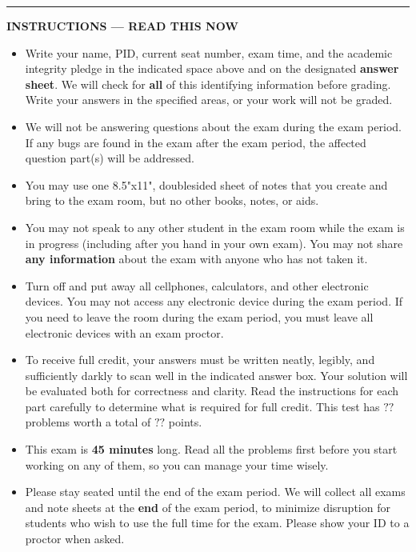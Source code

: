 \begin{center}
  \begin{minipage}[t]{7in}
  \rule{\linewidth}{2pt}
  \textbf{INSTRUCTIONS --- READ THIS NOW}
  \begin{itemize}
  
  \setlength{\itemsep}{0.025in}
  
  \item  Write your name, PID, current seat number, exam time, 
  and the academic integrity pledge in the indicated space above and 
  on the designated  {\bf answer sheet}.
  We will check for {\bf all} of this identifying information before grading.
  Write your answers in the specified areas, or your work will not be graded. 
  
  \item We will not be answering questions about the exam during the exam period. 
  If any bugs are found in the exam after the exam period, the affected question part(s) will be addressed.
  
  \item  You may use one 8.5"x11", doublesided sheet of notes that you create and bring to the exam room, but no other books, notes, or aids.
  
  \item You may not speak to any other student in the exam room while the exam 
  is in progress (including after you hand in your own exam).  You may not share
  {\bf any information} about the exam with anyone who has not taken it.
  
  \item Turn off and put away all cellphones, calculators, and other electronic devices.
  You may not access any electronic device during the exam period. If you need to leave 
  the room during the exam period, you must leave all electronic devices with an exam proctor.
  
  \item  To receive full credit, your answers must
  be written neatly, legibly, and sufficiently darkly to scan well in the indicated answer box. Your solution will be evaluated both for correctness and clarity.
  Read the instructions for each part carefully to determine what is required for full credit.
  This test has $??$ problems worth a total of $??$ points.
  
  \item This exam is {\bf 45 minutes} long. Read all the problems first before you start 
  working on any of them, so you can manage your time wisely.
  
  \item Please stay seated until the end of the exam period.
  We will collect all exams and note sheets at the {\bf end} of the exam period, to minimize disruption 
  for students who wish to use the full time for the exam. Please show your ID to a proctor when 
  asked.
  
  
  \end{itemize}
  \end{minipage} \hfill
  \end{center}
  \newpage
\fi

